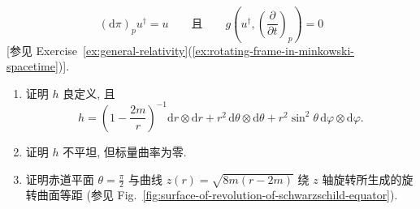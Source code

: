 \begin{RiemannExercise}
\begin{enumerate}[label=(\arabic*),ref=\arabic*,leftmargin=*]
\[
  (\mathrm{d}\pi)_p u^\dagger=u
  \qquad\text{且}\qquad
  g\left(u^\dagger,\left(\frac{\partial}{\partial t}\right)_p\right)=0
\]
[参见 Exercise~\ref{ex:general-relativity}(\ref{ex:rotating-frame-in-minkowski-spacetime})].
\begin{enumerate}[label=(\alph*),leftmargin=*]
\item 证明 $h$ 良定义, 且
\[
  h=\left(1-\frac{2m}{r}\right)^{-1}\mathrm{d}r\otimes\mathrm{d}r
    +r^2\,\mathrm{d}\theta\otimes\mathrm{d}\theta
    +r^2\sin^2\theta\,\mathrm{d}\varphi\otimes\mathrm{d}\varphi.
\]
\item 证明 $h$ 不平坦, 但标量曲率为零.
\item 证明赤道平面 $\theta=\frac{\pi}{2}$ 与曲线 $z(r)=\sqrt{8m(r-2m)}$ 绕 $z$ 轴旋转所生成的旋转曲面等距 (参见 Fig.~\ref{fig:surface-of-revolution-of-schwarzschild-equator}).


\end{enumerate}
\end{enumerate}
\end{RiemannExercise}

